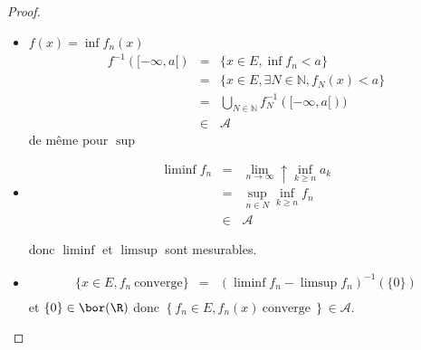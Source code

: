 \begin{proof}
	\begin{itemize}
		\item $f(x) = \inf f_n (x)$
		      \begin{eqnarray*}
			      f^{-1}([-\infty, a[) &=& \{x \in E, \inf f_n < a\} \\
			      &=& \{x \in E, \exists N \in \mathbb{N}, f_N (x) < a \}\\
			      &=& \bigcup\limits_{N\in \mathbb{N}}f_N^{-1}([-\infty, a[))\\
			      &\in& \mathscr{A}
		      \end{eqnarray*}
		      de même pour $\sup$
		\item \begin{eqnarray*}
			      \liminf f_n &=& \lim\limits_{n \to \infty}\uparrow \inf\limits_{k \geq n } a_k\\
			      &=& \sup _{n\in N} \inf_{k \geq n} f_n\\
			      &\in& \mathscr{A}
		      \end{eqnarray*}

		      donc $\liminf$ et $\limsup$ sont mesurables.
		\item
		      \begin{eqnarray*}
			      \{x \in E, f_n \  \text{converge} \}  &=& (\liminf f_n - \limsup f_n)^{-1}(\{0\})\\
		      \end{eqnarray*}
		      et $\{ 0 \} \in \bor(\R)$ donc $\left\{ f_n \in E, f_n(x) \ \text{converge} \ \right\} \in \mathscr{A}$.
	\end{itemize}

\end{proof}

